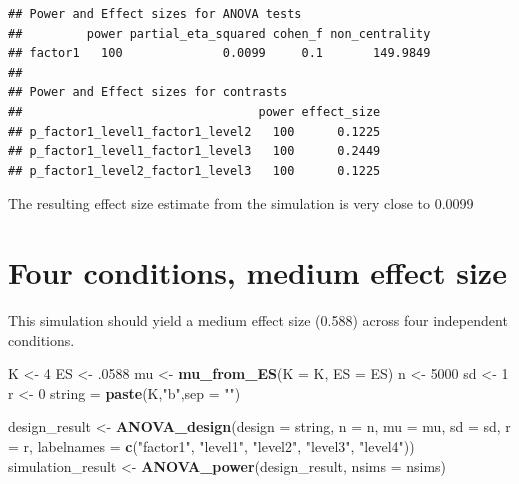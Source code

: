 \documentclass[]{book}
\newenvironment{Shaded}{\begin{snugshade}}{\end{snugshade}}
\newcommand{\DataTypeTok}[1]{\textcolor[rgb]{0.13,0.29,0.53}{#1}}
\newcommand{\DecValTok}[1]{\textcolor[rgb]{0.00,0.00,0.81}{#1}}
\newcommand{\FloatTok}[1]{\textcolor[rgb]{0.00,0.00,0.81}{#1}}
\newcommand{\KeywordTok}[1]{\textcolor[rgb]{0.13,0.29,0.53}{\textbf{#1}}}
\newcommand{\NormalTok}[1]{#1}
\newcommand{\StringTok}[1]{\textcolor[rgb]{0.31,0.60,0.02}{#1}}
\begin{document}
\begin{verbatim}
## Power and Effect sizes for ANOVA tests
##         power partial_eta_squared cohen_f non_centrality
## factor1   100              0.0099     0.1       149.9849
## 
## Power and Effect sizes for contrasts
##                                 power effect_size
## p_factor1_level1_factor1_level2   100      0.1225
## p_factor1_level1_factor1_level3   100      0.2449
## p_factor1_level2_factor1_level3   100      0.1225
\end{verbatim}

The resulting effect size estimate from the simulation is very close to 0.0099

\hypertarget{four-conditions-medium-effect-size}{%
\section{Four conditions, medium effect size}\label{four-conditions-medium-effect-size}}

This simulation should yield a medium effect size (0.588) across four independent conditions.

\begin{Shaded}
\begin{Highlighting}[]
\NormalTok{K <-}\StringTok{ }\DecValTok{4}
\NormalTok{ES <-}\StringTok{ }\FloatTok{.0588}
\NormalTok{mu <-}\StringTok{ }\KeywordTok{mu_from_ES}\NormalTok{(}\DataTypeTok{K =}\NormalTok{ K, }\DataTypeTok{ES =}\NormalTok{ ES)}
\NormalTok{n <-}\StringTok{ }\DecValTok{5000}
\NormalTok{sd <-}\StringTok{ }\DecValTok{1}
\NormalTok{r <-}\StringTok{ }\DecValTok{0}
\NormalTok{string =}\StringTok{ }\KeywordTok{paste}\NormalTok{(K,}\StringTok{"b"}\NormalTok{,}\DataTypeTok{sep =} \StringTok{""}\NormalTok{)}
\end{Highlighting}
\end{Shaded}

\begin{Shaded}
\begin{Highlighting}[]
\NormalTok{design_result <-}\StringTok{ }\KeywordTok{ANOVA_design}\NormalTok{(}\DataTypeTok{design =}\NormalTok{ string,}
                   \DataTypeTok{n =}\NormalTok{ n, }
                   \DataTypeTok{mu =}\NormalTok{ mu, }
                   \DataTypeTok{sd =}\NormalTok{ sd, }
                   \DataTypeTok{r =}\NormalTok{ r, }
                   \DataTypeTok{labelnames =} \KeywordTok{c}\NormalTok{(}\StringTok{"factor1"}\NormalTok{, }\StringTok{"level1"}\NormalTok{, }\StringTok{"level2"}\NormalTok{, }\StringTok{"level3"}\NormalTok{, }\StringTok{"level4"}\NormalTok{))}
\NormalTok{simulation_result <-}\StringTok{ }\KeywordTok{ANOVA_power}\NormalTok{(design_result, }\DataTypeTok{nsims =}\NormalTok{ nsims)}
\end{Highlighting}
\end{Shaded}
\end{document}
